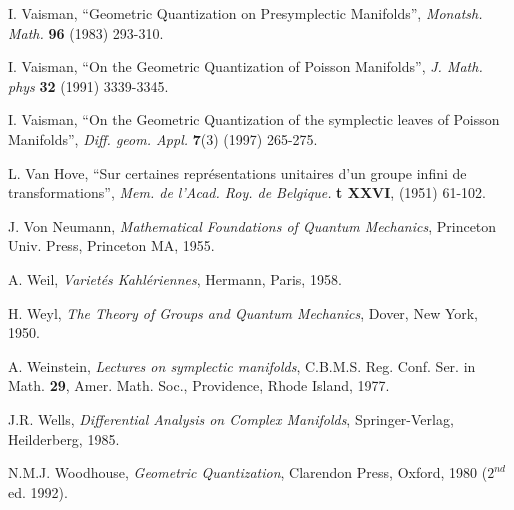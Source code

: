 \documentclass[12pt]{article}
\begin{document}
\begin{thebibliography}{55}
{\sc I. Vaisman},
``Geometric Quantization on Presymplectic Manifolds'',
{\it Monatsh. Math.} {\bf 96} (1983) 293-310.

{\sc I. Vaisman},
``On the Geometric Quantization of Poisson Manifolds'',
{\it J. Math. phys} {\bf 32} (1991) 3339-3345.

{\sc I. Vaisman},
``On the Geometric Quantization of the symplectic leaves of Poisson
Manifolds'',
{\it Diff. geom. Appl.} {\bf 7}(3) (1997) 265-275.

{\sc L. Van Hove},
``Sur certaines repr\'esentations unitaires
  d'un groupe infini de transformations'',
{\it Mem. de l'Acad. Roy. de Belgique.}
{\bf t XXVI}, (1951) 61-102.

{\sc J. Von Neumann},
{\it Mathematical Foundations of Quantum Mechanics},
Princeton Univ. Press, Princeton MA, 1955.

{\sc A. Weil},
{\it Variet\'es Kahl\'eriennes\/},
Hermann, Paris, 1958.

{\sc H. Weyl},
{\it The Theory of Groups and Quantum Mechanics},
Dover, New York, 1950.

{\sc A. Weinstein},
{\it Lectures on symplectic manifolds\/},
C.B.M.S. Reg. Conf. Ser. in Math. {\bf 29},
Amer. Math. Soc., Providence, Rhode Island, 1977.

{\sc J.R. Wells},
{\it Differential Analysis on Complex Manifolds},
Springer-Verlag, Heilderberg, 1985.

{\sc N.M.J. Woodhouse},
{\it Geometric Quantization\/}, Clarendon Press, Oxford, 1980 ($2^{nd}$
ed. 1992).

\end{thebibliography}
\end{document}
